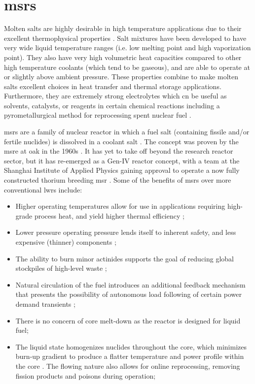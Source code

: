\section{\texorpdfstring{\aclp{msr}}{Molten Salt Reactors}}
Molten salts are highly desirable in high temperature applications due to their excellent thermophysical properties \cite{RoperReview}. Salt mixtures have been developed to have very wide liquid temperature ranges (i.e. low melting point and high vaporization point). They also have very high volumetric heat capacities compared to other high temperature coolants (which tend to be gaseous), and are able to operate at or slightly above ambient pressure. These properties combine to make molten salts excellent choices in heat transfer and thermal storage applications. Furthermore, they are extremely strong electrolytes which cn be useful as solvents, catalysts, or reagents in certain chemical reactions including a pyrometallurgical method for reprocessing spent nuclear fuel \cite{Simpson}.

\acfp{msr} are a family of nuclear reactor in which a fuel salt (containing fissile and/or fertile nuclides) is dissolved in a coolant salt \cite{RoperOverview}. The concept was proven by the \acf{msre} at \acf{oak} in the 1960s \cite{MSRE}. It has yet to take off beyond the research reactor sector, but it has re-emerged as a Gen-IV reactor concept, with a team at the Shanghai Institute of Applied Physics gaining approval to operate a now fully constructed thorium breeding \acs{msr} \cite{china}. Some of the benefits of \acsp{msr} over more conventional \acsp{lwr} include:
\begin{itemize}
    \item Higher operating temperatures allow for use in applications requiring high-grade process heat, and yield higher thermal efficiency \cite{RoperOverview};
    \item Lower pressure operating pressure lends itself to inherent safety, and less expensive (thinner) components \cite{RoperReview};
    \item The ability to burn minor actinides supports the goal of reducing global stockpiles of high-level waste \cite{RoperReview};
    \item Natural circulation of the fuel introduces an additional feedback mechanism that presents the possibility of autonomous load following of certain power demand transients \cite{CarterNumerical};
    \item There is no concern of core melt-down as the reactor is designed for liquid fuel;
    \item The liquid state homogenizes nuclides throughout the core, which minimizes burn-up gradient to produce a flatter temperature and power profile within the core \cite[Ch. 3]{TodreasKazimi1}. The flowing nature also allows for online reprocessing, removing fission products and poisons during operation;
\end{itemize}

